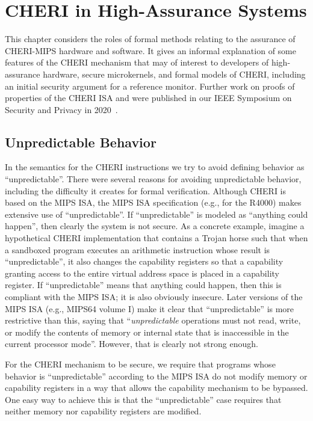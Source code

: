 \chapter{CHERI in High-Assurance Systems}
\label{chap:assurance}

This chapter considers the roles of formal methods relating to the assurance
of CHERI-MIPS hardware and software.  It gives an informal explanation of some
features of the CHERI mechanism that may of interest to developers of
high-assurance hardware, secure microkernels, and formal models of CHERI,
including an initial security argument for a reference monitor.  Further
work on proofs of properties of the CHERI ISA and were published in our
IEEE Symposium on Security and Privacy in 2020~\cite{cheri-formal-SP2020}.

\section{Unpredictable Behavior}

In the semantics for the CHERI instructions
we try
to avoid defining behavior as ``unpredictable''. There were several reasons
for avoiding unpredictable behavior, including the difficulty it creates for
formal verification.
Although CHERI is based on the MIPS ISA,
the MIPS ISA specification (e.g., for the
R4000) makes extensive use of ``unpredictable''. If ``unpredictable'' is
modeled as ``anything could happen'', then clearly the system is not secure.
As a
concrete example, imagine a hypothetical CHERI implementation that contains
a Trojan horse such that when a sandboxed program executes an arithmetic
instruction whose result is ``unpredictable'', it also changes the capability
registers so that a capability granting access to the entire virtual address
space is placed in a capability register. If ``unpredictable'' means that
anything could happen, then this is compliant with the MIPS ISA; it is also
obviously insecure. Later versions of the MIPS ISA (e.g., MIPS64 volume I) make
it clear that ``unpredictable'' is more restrictive than this, saying that
``\emph{unpredictable} operations must not read, write, or modify the contents of
memory or internal state that is inaccessible in the current processor mode''.
However, that is clearly not strong enough.

For the CHERI mechanism to be secure, we require that programs whose behavior
is ``unpredictable'' according to the MIPS ISA do not modify memory or
capability registers in a way that allows the capability mechanism to be bypassed.
One easy way to achieve this is that the ``unpredictable'' case requires that
neither memory nor capability registers are modified.

